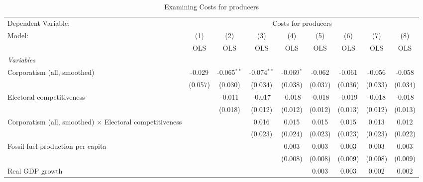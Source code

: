 
\begin{table}[htbp]
   \caption{Examining Costs for producers}
   \centering
   \begin{tabular}{lcccccccc}
      \toprule
      Dependent Variable: & \multicolumn{8}{c}{Costs for producers}\\
      Model:                                                          & (1)     & (2)           & (3)           & (4)          & (5)     & (6)     & (7)     & (8)\\  
                                                                      &  OLS    & OLS           & OLS           & OLS          & OLS     & OLS     & OLS     & OLS\\  
      \midrule
      \emph{Variables}\\
      Corporatism (all, smoothed)                                     & -0.029  & -0.065$^{**}$ & -0.074$^{**}$ & -0.069$^{*}$ & -0.062  & -0.061  & -0.056  & -0.058\\   
                                                                      & (0.057) & (0.030)       & (0.034)       & (0.038)      & (0.037) & (0.036) & (0.033) & (0.034)\\   
      Electoral competitiveness                                       &         & -0.011        & -0.017        & -0.018       & -0.018  & -0.019  & -0.018  & -0.018\\   
                                                                      &         & (0.018)       & (0.012)       & (0.012)      & (0.012) & (0.013) & (0.012) & (0.013)\\   
      Corporatism (all, smoothed) $\times$ Electoral competitiveness  &         &               & 0.016         & 0.015        & 0.015   & 0.015   & 0.013   & 0.012\\   
                                                                      &         &               & (0.023)       & (0.024)      & (0.023) & (0.023) & (0.023) & (0.022)\\   
      Fossil fuel production per capita                               &         &               &               & 0.003        & 0.003   & 0.003   & 0.003   & 0.003\\   
                                                                      &         &               &               & (0.008)      & (0.008) & (0.009) & (0.008) & (0.009)\\   
      Real GDP growth                                                 &         &               &               &              & 0.003   & 0.003   & 0.002   & 0.002\\   

\end{tabular}
\end{table}
